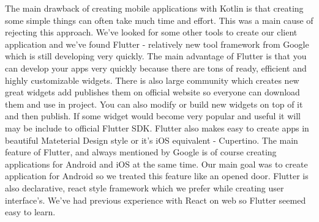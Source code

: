 \documentclass[../Main.tex]{subfiles}
\begin{document}
        The main drawback of creating mobile applications with Kotlin is that creating
        some simple things can often take much time and effort. 
        This was a main cause of rejecting this approach.
        We've looked for some other tools to create our client application and 
        we've found Flutter - relatively new tool framework from Google which 
        is still developing very quickly.
        The main advantage of Flutter is that you can develop your apps very 
        quickly because there are tons of ready, efficient and highly customizable 
        widgets. There is also large community which creates new great widgets 
        add publishes them on official website so everyone can download them and use in project.
        You can also modify or build new widgets on top of it and then publish.
        If some widget would become very popular and useful it will may be 
        include to official Flutter SDK. 
        Flutter also makes easy to create apps in beautiful Mateterial Design 
        style or it's iOS equivalent - Cupertino. 
        The main feature of Flutter, and always mentioned by Google is of course 
        creating applications for Android and iOS at the same time. 
        Our main goal was to create application for Android so we treated this feature like 
        an opened door. 
        Flutter is also declarative, react style framework which we prefer while
        creating user interface's. We've had previous experience with React on web
        so Flutter seemed easy to learn. 
    

\biblio %
\end{document}
